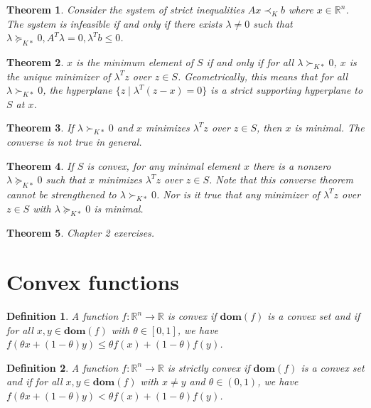 \documentclass[a4paper]{article}
\newtheorem{mytheorem}{Theorem}
\newtheorem{mydef}{Definition}
\numberwithin{mytheorem}{section}
\numberwithin{mydef}{section}
\numberwithin{example}{section}
\begin{document}
\begin{mytheorem} Consider the system of strict inequalities $Ax \prec_{K} b$ where $x \in \mathbb{R}^{n}$. The system is infeasible if and only if there exists $\lambda \neq 0$ such that $\lambda \succeq_{K*} 0, A^{T}\lambda = 0, \lambda^{T}b \leq 0$. 
\end{mytheorem}

\begin{mytheorem} $x$ is the minimum element of $S$ if and only if for all $\lambda \succ_{K*} 0$, $x$ is the unique minimizer of $\lambda^{T}z$ over $z \in S$. Geometrically, this means that for all $\lambda \succ_{K*} 0$, the hyperplane $\{ z \mid \lambda^{T}(z-x) = 0 \}$ is a strict supporting hyperplane to $S$ at $x$. 
\end{mytheorem}

\begin{mytheorem} If $\lambda \succ_{K*} 0$ and $x$ minimizes $\lambda^{T}z$ over $z \in S$, then $x$ is minimal. The converse is not true in general. 
\end{mytheorem}

\begin{mytheorem} If $S$ is convex, for any minimal element $x$ there is a nonzero $\lambda \succeq_{K*} 0$ such that $x$ minimizes $\lambda^{T}z$ over $z \in S$. Note that this converse theorem cannot be strengthened to $\lambda \succ_{K*} 0$. Nor is it true that any minimizer of $\lambda^{T}z$ over $z \in S$ with $\lambda \succeq_{K*} 0$ is minimal.
\end{mytheorem}

\begin{mytheorem} Chapter 2 exercises.
\end{mytheorem}

\section{Convex functions}

\begin{mydef} A function $f : \mathbb{R}^{n} \rightarrow \mathbb{R} $ is convex if $\textbf{dom}(f)$ is a convex set and if for all $x,y \in \textbf{dom}(f)$ with $\theta \in [0,1]$, we have $f(\theta x + (1-\theta)y) \leq \theta f(x) + (1-\theta)f(y)$.  \end{mydef}

\begin{mydef} A function $f : \mathbb{R}^{n} \rightarrow \mathbb{R} $ is strictly convex if $\textbf{dom}(f)$ is a convex set and if for all $x,y \in \textbf{dom}(f)$ with $x \neq y$ and $\theta \in (0,1)$, we have $f(\theta x + (1-\theta)y) < \theta f(x) + (1-\theta)f(y)$.  \end{mydef}
\end{document}
